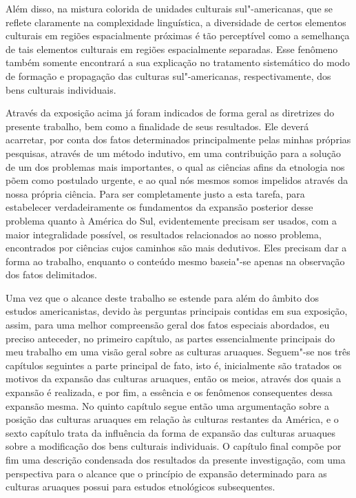 Além disso, na mistura colorida de unidades culturais sul"-americanas,
que se reflete claramente na complexidade linguística, a diversidade de
certos elementos culturais em regiões espacialmente próximas é tão
perceptível como a semelhança de tais elementos culturais em regiões
espacialmente separadas. Esse fenômeno também somente encontrará a sua
explicação no tratamento sistemático do modo de formação e propagação
das culturas sul"-americanas, respectivamente, dos bens culturais
individuais.

Através da exposição acima já foram indicados de forma geral as
diretrizes do presente trabalho, bem como a finalidade de seus
resultados. Ele deverá acarretar, por conta dos fatos determinados
principalmente pelas minhas próprias pesquisas, através de um método
indutivo, em uma contribuição para a solução de um dos problemas mais
importantes, o qual as ciências afins da etnologia nos põem como
postulado urgente, e ao qual nós mesmos somos impelidos através da nossa
própria ciência. Para ser completamente justo a esta tarefa, para
estabelecer verdadeiramente os fundamentos da expansão posterior desse
problema quanto à América do Sul, evidentemente precisam ser usados,
com a maior integralidade possível, os resultados relacionados ao nosso
problema, encontrados por ciências cujos caminhos são mais dedutivos.
Eles precisam dar a forma ao trabalho, enquanto o conteúdo mesmo
baseia"-se apenas na observação dos fatos delimitados.

{Uma vez que o alcance deste trabalho se estende para além do âmbito dos
estudos americanistas, devido às perguntas principais contidas em sua
exposição, assim, para uma melhor compreensão geral dos fatos especiais
abordados, eu preciso anteceder, no primeiro capítulo, as partes
essencialmente principais do meu trabalho em uma visão geral sobre as
culturas aruaques. Seguem"-se nos três capítulos seguintes a parte
principal de fato, isto é, inicialmente são tratados os motivos da
expansão das culturas aruaques, então os meios, através dos quais a
expansão é realizada, e por fim, a essência e os fenômenos consequentes
dessa expansão mesma. No quinto capítulo segue então uma argumentação
sobre a posição das culturas aruaques em relação às culturas restantes da
América, e o sexto capítulo trata da influência da forma de expansão das
culturas aruaques sobre a modificação dos bens culturais individuais. O
capítulo final compõe por fim uma descrição condensada dos resultados da
presente investigação, com uma perspectiva para o alcance que o
princípio de expansão determinado para as culturas aruaques possui para
estudos etnológicos subsequentes.}

